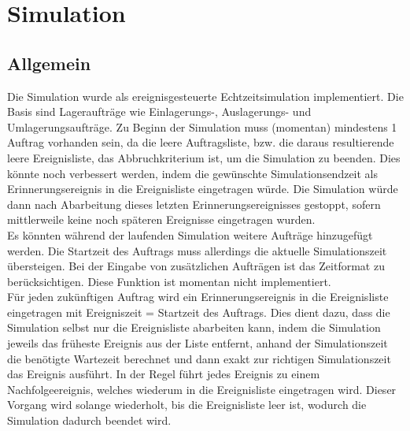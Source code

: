 \section{Simulation}
\subsection{Allgemein}
Die Simulation wurde als ereignisgesteuerte Echtzeitsimulation implementiert. Die Basis sind Lageraufträge wie Einlagerungs-, Auslagerungs- und Umlagerungsaufträge. Zu Beginn der Simulation muss (momentan) mindestens 1 Auftrag vorhanden sein, da die leere Auftragsliste, bzw. die daraus resultierende leere Ereignisliste, das Abbruchkriterium ist, um die Simulation zu beenden. Dies könnte noch verbessert werden, indem die gewünschte Simulationsendzeit als Erinnerungsereignis in die Ereignisliste eingetragen würde. Die Simulation würde dann nach Abarbeitung dieses letzten Erinnerungsereignisses gestoppt, sofern mittlerweile keine noch späteren Ereignisse eingetragen wurden. \\
Es könnten während der laufenden Simulation weitere Aufträge hinzugefügt werden. Die Startzeit des Auftrags muss allerdings die aktuelle Simulationszeit übersteigen. Bei der Eingabe von zusätzlichen Aufträgen ist das Zeitformat zu berücksichtigen. Diese Funktion ist momentan nicht implementiert.
\\
Für jeden zukünftigen Auftrag wird ein Erinnerungsereignis in die Ereignisliste eingetragen mit Ereigniszeit = Startzeit des Auftrags. Dies dient dazu, dass die Simulation selbst nur die Ereignisliste abarbeiten kann, indem die Simulation jeweils das früheste Ereignis aus der Liste entfernt, anhand der Simulationszeit die benötigte Wartezeit berechnet und dann exakt zur richtigen Simulationszeit das Ereignis ausführt. In der Regel führt jedes Ereignis zu einem Nachfolgeereignis, welches
wiederum in die Ereignisliste eingetragen wird. Dieser Vorgang wird solange wiederholt, bis die Ereignisliste leer ist, wodurch die Simulation dadurch
beendet wird.
%
